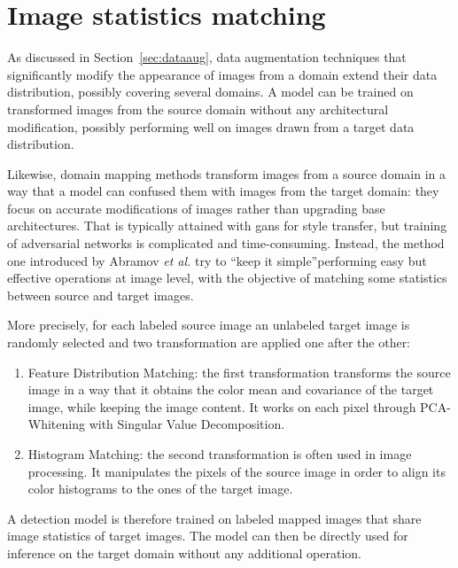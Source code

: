 \documentclass[%
    corpo=12pt,
    twoside,
    stile=classica,   
    tipotesi=magistrale,
    evenboxes,
    english
]{toptesi}
\begin{document}
\section{Image statistics matching}
As discussed in Section~\ref{sec:dataaug}, data augmentation techniques that significantly modify the appearance of images from a domain extend their data distribution, possibly covering several domains. A model can be trained on transformed images from the source domain without any architectural modification, possibly performing well on images drawn from a target data distribution.

Likewise, domain mapping methods transform images from a source domain in a way that a model can confused them with images from the target domain: they focus on accurate modifications of images rather than upgrading base architectures. That is typically attained with \glspl{gan} for style transfer, but training of adversarial networks is complicated and time-consuming. Instead, the method one introduced by Abramov \textit{et al.}\cite{abramov2020simple} try to \textquotedblleft keep it simple\textquotedblright performing easy but effective operations at image level, with the objective of matching some statistics between source and target images.

More precisely, for each labeled source image an unlabeled target image is randomly selected and two transformation are applied one after the other:
\begin{enumerate}
	\item Feature Distribution Matching: the first transformation transforms the source image in a way that it obtains the color mean and covariance of the target image, while keeping the image content. It works on each pixel through PCA-Whitening with Singular Value Decomposition.
	\item Histogram Matching: the second transformation is often used in image processing. It manipulates the pixels of the source image in order to align its color histograms to the ones of the target image.
\end{enumerate}
A detection model is therefore trained on labeled mapped images that share image statistics of target images. The model can then be directly used for inference on the target domain without any additional operation.
\end{document}
